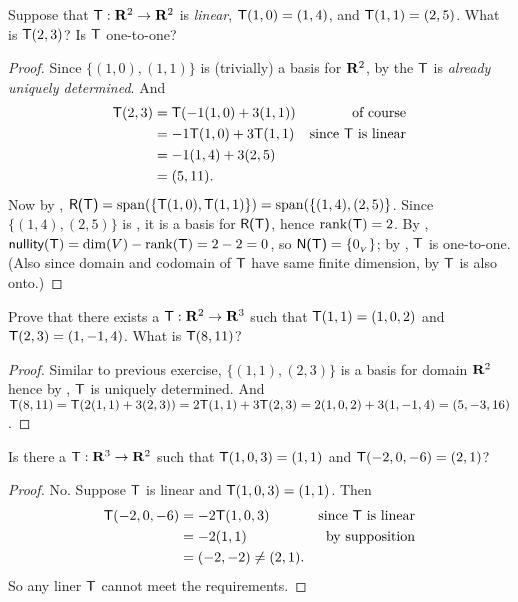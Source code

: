 \begin{exercise} \label{exercise 2.1.10}
Suppose that \(\textsf{T} : \mathbf{R}^2 \to \mathbf{R}^2\) is \emph{linear}, \(\textsf{T}(1, 0) = (1, 4)\), and \(\textsf{T}(1, 1) = (2, 5)\).
What is \(\textsf{T}(2, 3)\)?
Is \(\textsf{T}\) one-to-one?
\end{exercise}

\begin{proof}
Since \(\{ (1, 0), (1, 1) \}\) is (trivially) a basis for \(\mathbf{R}^2\), by  the \(\textsf{T}\) is \emph{already uniquely determined}.
And
\begin{align*}
    \textsf{T}(2, 3) & = \textsf{T}(-1(1, 0) + 3(1, 1)) & \text{of course} \\
             & = -1\textsf{T}(1, 0) + 3\textsf{T}(1, 1) & \text{since \(\textsf{T}\) is linear} \\
             & = -1(1, 4) + 3(2, 5) \\
             & = (5, 11).
\end{align*}
Now by , \(\textsf{R(T)} = \operatorname{span}(\{ \textsf{T}(1, 0), \textsf{T}(1, 1) \}) = \operatorname{span}(\{ (1, 4), (2, 5) \}\).
Since \(\{ (1, 4), (2, 5) \}\) is \LID{}, it is a basis for \(\textsf{R(T)}\), hence \(\mathrm{rank}(\textsf{T}) = 2\).
By , \(\textsf{nullity}(\textsf{T}) = \dim(V) - \mathrm{rank}(\textsf{T}) = 2 - 2 = 0\), so \(\textsf{N(T)} = \{ 0_{_V} \}\);
by , \(\textsf{T}\) is one-to-one.
(Also since domain and codomain of \(\textsf{T}\) have same finite dimension, by  \(\textsf{T}\) is also onto.)
\end{proof}

\begin{exercise} \label{exercise 2.1.11}
Prove that there exists a \LTRAN{} \(\textsf{T} : \mathbf{R}^2 \to \mathbf{R}^3\) such that \(\textsf{T}(1, 1) = (1, 0, 2)\) and \(\textsf{T}(2, 3) = (1, -1, 4)\).
What is \(\textsf{T}(8, 11)\)?
\end{exercise}

\begin{proof}
Similar to previous exercise, \(\{ (1, 1), (2, 3) \}\) is a basis for domain \(\mathbf{R}^2\) hence by , \(\textsf{T}\) is uniquely determined.
And \(\textsf{T}(8, 11) = \textsf{T}(2(1, 1) + 3(2, 3)) = 2\textsf{T}(1, 1) + 3\textsf{T}(2, 3) = 2(1, 0, 2) + 3(1, -1, 4) = (5, -3, 16)\).
\end{proof}

\begin{exercise} \label{exercise 2.1.12}
Is there a \LTRAN{} \(\textsf{T} : \mathbf{R}^3 \to \mathbf{R}^2\) such that \(\textsf{T}(1, 0, 3) = (1, 1)\) and \(\textsf{T}(-2, 0, -6) = (2, 1)\)?
\end{exercise}

\begin{proof}
No.
Suppose \(\textsf{T}\) is linear and \(\textsf{T}(1, 0, 3) = (1, 1)\).
Then
\begin{align*}
    \textsf{T}(-2, 0, -6) & = -2\textsf{T}(1, 0, 3) & \text{since \(\textsf{T}\) is linear} \\
                  & = -2(1, 1) & \text{by supposition} \\
                  & = (-2, -2) \ne (2, 1).
\end{align*}
So any liner \(\textsf{T}\) cannot meet the requirements.
\end{proof}

